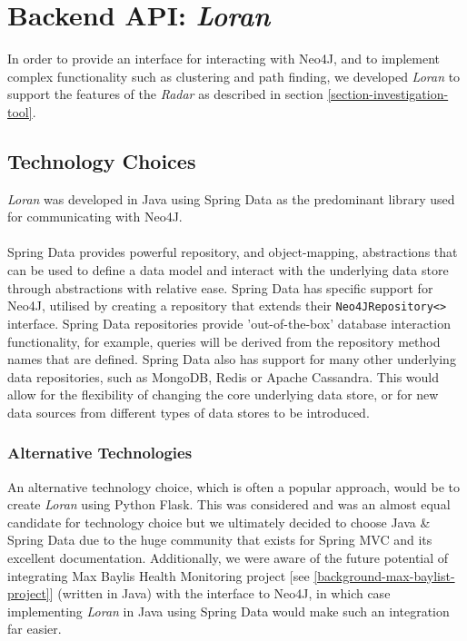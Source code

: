 \chapter{Backend API: \textit{Loran}}\label{section-backend-api}
In order to provide an interface for interacting with Neo4J, and to implement complex functionality such as clustering and path finding, we developed \textit{Loran} to support the features of the \textit{Radar} as described in section \ref{section-investigation-tool}. 

\section{Technology Choices}
\textit{Loran} was developed in Java using Spring Data as the predominant library used for communicating with Neo4J. 
\\\\
Spring Data provides powerful repository, and object-mapping, abstractions that can be used to define a data model and interact with the underlying data store through abstractions with relative ease. Spring Data has specific support for Neo4J, utilised by creating a repository that extends their \texttt{Neo4JRepository<>} interface. Spring Data repositories provide 'out-of-the-box' database interaction functionality, for example, queries will be derived from the repository method names that are defined. Spring Data also has support for many other underlying data repositories, such as MongoDB, Redis or Apache Cassandra. This would allow for the flexibility of changing the core underlying data store, or for new data sources from different types of data stores to be introduced.

\subsection{Alternative Technologies}
An alternative technology choice, which is often a popular approach, would be to create \textit{Loran} using Python Flask. This was considered and was an almost equal candidate for technology choice but we ultimately decided to choose Java \& Spring Data due to the huge community that exists for Spring MVC and its excellent documentation. Additionally, we were aware of the future potential of integrating Max Baylis Health Monitoring project [see \ref{background-max-baylist-project}] (written in Java) with the interface to Neo4J, in which case implementing \textit{Loran} in Java using Spring Data would make such an integration far easier. 


